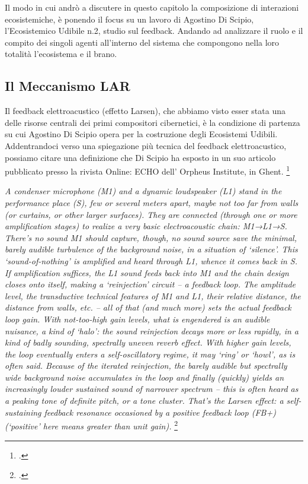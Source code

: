 Il modo in cui andrò a discutere in questo capitolo la composizione di interazioni ecosistemiche, 
è ponendo il focus su un lavoro di Agostino Di Scipio, l’Ecosistemico Udibile n.2, studio sul feedback. 
Andando ad analizzare il ruolo e il compito dei singoli agenti all'interno del sistema 
che compongono nella loro totalità l'ecosistema e il brano. 

\subsection{Il Meccanismo LAR}
\label{sec:Il Meccanismo LAR}
Il feedback elettroacustico (effetto Larsen), che abbiamo visto
esser stata una delle risorse centrali dei primi compositori cibernetici,
è la condizione di partenza su cui Agostino Di Scipio opera per la costruzione degli Ecosistemi Udibili.
Addentrandoci verso una spiegazione più tecnica del feedback elettroacustico,
possiamo citare una definizione che Di Scipio ha esposto in un suo articolo
pubblicato presso la rivista Online: ECHO dell’ Orpheus Institute, in
Ghent. \footcite{di_scipio_relational_2022}

\begin{center}
\vspace{0.5cm}
\textit{A condenser microphone (M1) and a dynamic loudspeaker (L1) stand in the performance place
(S), few or several meters apart, maybe not too far from walls (or curtains, or other larger
surfaces). They are connected (through one or more amplification stages) to realize a very
basic electroacoustic chain: M1→L1→S. There’s no sound M1 should capture, though, no sound
source save the minimal, barely audible turbulence of the background noise, in a situation of
‘silence’. This ‘sound-of-nothing’ is amplified and heard through L1, whence it comes back in
S. \\
If amplification suffices, the L1 sound feeds back into M1 and the chain design closes onto
itself, making a ‘reinjection’ circuit – a feedback loop. The amplitude level, the
transductive technical features of M1 and L1, their relative distance, the distance from
walls, etc. – all of that (and much more) sets the actual feedback loop gain. With
not-too-high gain levels, what is engendered is an audible nuisance, a kind of ‘halo’: the
sound reinjection decays more or less rapidly, in a kind of badly sounding, spectrally uneven
reverb effect. With higher gain levels, the loop eventually enters a self-oscillatory regime,
it may ‘ring’ or ‘howl’, as is often said. Because of the iterated reinjection, the barely
audible but spectrally wide background noise accumulates in the loop and finally (quickly)
yields an increasingly louder sustained sound of narrower spectrum – this is often heard as a
peaking tone of definite pitch, or a tone cluster. That’s the Larsen effect: a self-sustaining
feedback resonance occasioned by a positive feedback loop (FB+) (‘positive’ here means greater
than unit gain).} \footcite{di_scipio_relational_2022}
\vspace{0.5cm}
\vspace{0.5cm}
\end{center}

